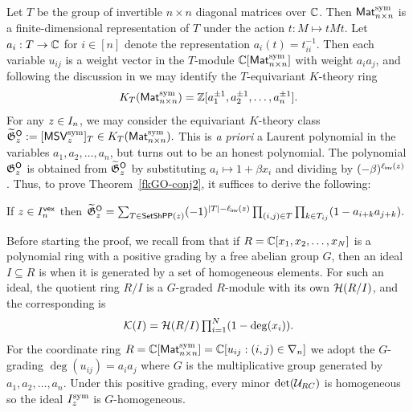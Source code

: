 \documentclass[10pt]{article}
\begin{document}
Let $T$ be the group of invertible $n\times n$ diagonal matrices over $\mathbb{C}$. 
Then $\mathsf{Mat}^{\mathrm{sym}}_{n\times n}$ is a finite-dimensional representation of $T$
under the action $t : M \mapsto tMt$.
Let $a_i : T \to \mathbb{C}$ for $i \in [n]$ denote the representation $a_i(t) = t_{ii}^{-1}$.
Then each variable $u_{ij}$ is a weight vector in the $T$-module $\mathbb{C}[\mathsf{Mat}^{\mathrm{sym}}_{n\times n}]$ with weight $a_ia_j$,
and following the discussion in \cite[\S2.4]{MarPawK} 
we may identify the $T$-equivariant $K$-theory ring 
\[
K_{T}(\mathsf{Mat}^{\mathrm{sym}}_{n\times n})=\mathbb{Z}[a_1^{\pm 1},a_2^{\pm 1}, \ldots, a_n^{\pm 1}].
\]
For any $z \in I_n$,
we may consider the equivariant $K$-theory class $\widetilde{\mathfrak{G}}^{\textsf{O}}_z := [\mathsf{MSV}^{\mathrm{sym}}_z]_T  \in K_{T}(\mathsf{Mat}^{\mathrm{sym}}_{n\times n}).$
This is \emph{a priori} a Laurent polynomial in the variables $a_1,a_2,\dots,a_n$, but turns out to be an honest polynomial.
The polynomial $\mathfrak{G}^{\mathsf{O}}_z$ is obtained from $\widetilde{\mathfrak{G}}^{\textsf{O}}_z$
by substituting $a_i\mapsto 1 + \beta x_i$  and dividing by $(-\beta)^{\ell_{\mathsf{inv}}(z)}$ \cite[Def.~2.18]{MarPawK}.
Thus, to prove Theorem~\ref{fkGO-conj2}, it suffices to derive the following:

\begin{theorem}\label{fkGO-conj3}
If $z \in I^{\mathsf{vex}}_n$ then  
$\widetilde{\mathfrak{G}}^{\textsf{O}}_z=\sum_{T \in  \mathsf{SetShPP}(z) } (-1)^{|T|-\ell_{\mathsf{inv}}(z)} \prod_{(i,j) \in T} \prod_{k \in T_{ij}} (1 - a_{i+k}a_{j+k}).$
\end{theorem}

 Before starting the proof, we recall from \cite[\S4.4]{MarPaw2022} that
if $R=\mathbb{C}[x_1,x_2,\dots,x_N]$ is a polynomial ring with a positive grading by a free abelian group $G$,
then an ideal $I \subseteq R$ is  when it is generated by a set of homogeneous elements. For such an ideal, the quotient ring $R/I$ is a $G$-graded $R$-module with its own  $\mathcal H(R/I)$,
and the corresponding   is \[\textstyle\mathcal{K}(I) = \mathcal H(R/I) \prod_{i=1}^N (1-\deg(x_i)).\]
For the coordinate ring $R = \mathbb{C}[\mathsf{Mat}^{\mathrm{sym}}_{n\times n}] = \mathbb{C}[u_{ij} : (i,j) \in \nabla_n]$ we adopt the $G$-grading $\deg(u_{ij} )=a_ia_j$ where $G$ is the multiplicative group generated by $a_1,a_2,\dots,a_n$.
Under this positive grading,
every minor $\det (\mathcal{U}_{RC})$ is homogeneous so the ideal $I^{\mathrm{sym}}_z$ is $G$-homogeneous.
\end{document}
